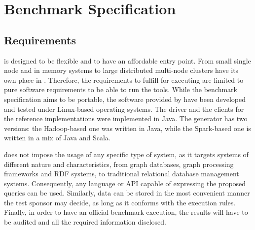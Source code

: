 \chapter{Benchmark Specification}
\label{sec:benchmark-specification}

\section{Requirements}

\ldbcsnb is designed to be flexible and to have an affordable entry point. From small single node and in memory systems to large distributed multi-node clusters have its own place in \ldbcsnb. Therefore, the requirements to fulfill for executing \ldbcsnb are limited to pure software requirements to be able to run the tools. While the benchmark specification aims to be portable, the software provided by \ldbcsnb have been developed and tested under Linux-based operating systems. The driver and the clients for the reference implementations were implemented in Java. The generator has two versions: the Hadoop-based one was written in Java, while the Spark-based one is written in a mix of Java and Scala.

\ldbcsnb does not impose the usage of any specific type of system, as it targets systems of different nature and characteristics, from graph databases, graph processing frameworks and RDF systems, to traditional relational database management systems. Consequently, any language or API capable of expressing the proposed queries can be used. Similarly, data can be stored in the most convenient manner the test sponsor may decide, as long as it conforms with the execution rules. Finally, in order to have an official benchmark execution, the results will have to be audited and all the required information disclosed.
